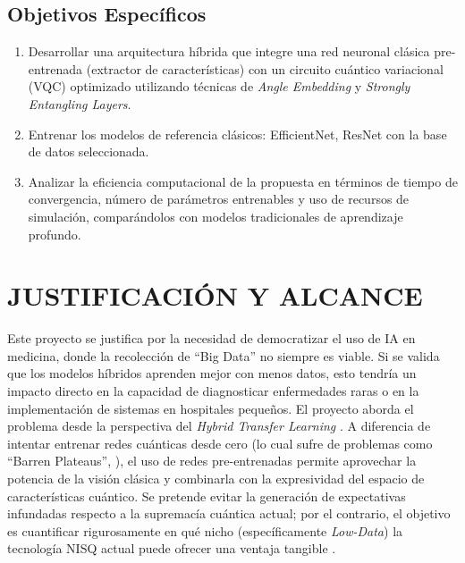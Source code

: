 \documentclass[12pt,letterpaper]{article}
\begin{document}
    \subsection{Objetivos Específicos}
    \vspace{-0.5cm}
    \begin{enumerate}
        \item Desarrollar una arquitectura híbrida que integre una red neuronal clásica pre-entrenada (extractor de características) con un circuito cuántico variacional (VQC) optimizado utilizando técnicas de \textit{Angle Embedding} y \textit{Strongly Entangling Layers}.
        \item Entrenar los modelos de referencia clásicos: EfficientNet, ResNet con la base de datos seleccionada.        
        \item Analizar la eficiencia computacional de la propuesta en términos de tiempo de convergencia, número de parámetros entrenables y uso de recursos de simulación, comparándolos con modelos tradicionales de aprendizaje profundo.
    \end{enumerate}

    \newpage
    \section{JUSTIFICACIÓN Y ALCANCE}
    \vspace{-0.5cm}

    Este proyecto se justifica por la necesidad de democratizar el uso de IA en medicina, donde la recolección de ``Big Data'' no siempre es viable.
    Si se valida que los modelos híbridos aprenden mejor con menos datos, esto tendría un impacto directo en la capacidad de diagnosticar enfermedades raras o en la implementación de sistemas en hospitales pequeños.
   El proyecto aborda el problema desde la perspectiva del \textit{Hybrid Transfer Learning} \citep{mari2020transfer}.
    A diferencia de intentar entrenar redes cuánticas desde cero (lo cual sufre de problemas como ``Barren Plateaus'', \citet{McClean2018B}), el uso de redes pre-entrenadas permite aprovechar la potencia de la visión clásica y combinarla con la expresividad del espacio de características cuántico.
    Se pretende evitar la generación de expectativas infundadas respecto a la supremacía cuántica actual; por el contrario, el objetivo es cuantificar rigurosamente en qué nicho (específicamente \textit{Low-Data}) la tecnología NISQ actual puede ofrecer una ventaja tangible \citep{gupta2025systematic}.
\end{document}
